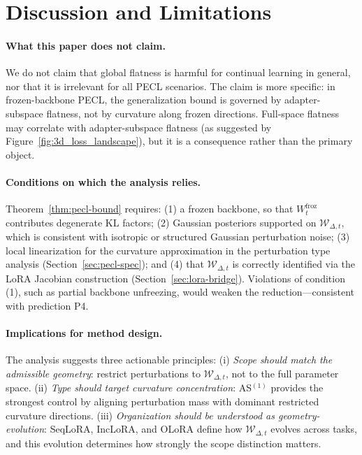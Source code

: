 \section{Discussion and Limitations}
\label{sec:discussion}

\paragraph{What this paper does not claim.}
We do not claim that global flatness is harmful for continual learning in general, nor that it is irrelevant for all PECL scenarios.
The claim is more specific: in frozen-backbone PECL, the generalization bound is governed by adapter-subspace flatness, not by curvature along frozen directions.
Full-space flatness may correlate with adapter-subspace flatness (as suggested by Figure~\ref{fig:3d_loss_landscape}), but it is a consequence rather than the primary object.

\paragraph{Conditions on which the analysis relies.}
Theorem~\ref{thm:pecl-bound} requires: (1) a frozen backbone, so that $W_t^{\mathrm{froz}}$ contributes degenerate KL factors; (2) Gaussian posteriors supported on $\mathcal{W}_{\Delta,t}$, which is consistent with isotropic or structured Gaussian perturbation noise; (3) local linearization for the curvature approximation in the perturbation type analysis (Section~\ref{sec:pecl-spec}); and (4) that $\mathcal{W}_{\Delta,t}$ is correctly identified via the LoRA Jacobian construction (Section~\ref{sec:lora-bridge}).
Violations of condition (1), such as partial backbone unfreezing, would weaken the reduction---consistent with prediction P4.

\paragraph{Implications for method design.}
The analysis suggests three actionable principles:
(i) \emph{Scope should match the admissible geometry}: restrict perturbations to $\mathcal{W}_{\Delta,t}$, not to the full parameter space.
(ii) \emph{Type should target curvature concentration}: AS$^{(1)}$ provides the strongest control by aligning perturbation mass with dominant restricted curvature directions.
(iii) \emph{Organization should be understood as geometry-evolution}: SeqLoRA, IncLoRA, and OLoRA define how $\mathcal{W}_{\Delta,t}$ evolves across tasks, and this evolution determines how strongly the scope distinction matters.
